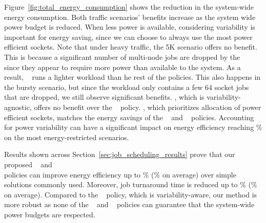 \par
Figure~\ref{fig:total_energy_consumption} shows the reduction in the system-wide energy
consumption. Both traffic scenarios' benefits increase as the system wide power budget is
reduced.  When less power is available, considering variability is important for energy
saving, since we can choose to always use the most power efficient sockets.  Note that
under heavy traffic, the 5K scenario offers no benefit.  This is because a significant
number of multi-node jobs are dropped by the \DefaultSched~ since they appear to require
more power than available to the system.  As a result, \DefaultSched~ runs a lighter
workload than he rest of the policies.  This also happens in the bursty scenario, but
since the workload only contains a few 64 socket jobs that are dropped, we still observe
significant benefits.  \PESched, which is variability-agnostic, offers no benefit over the
\DefaultSched~ policy.  \PEVASched, which prioritizes allocation of power efficient
sockets, matches the energy savings of the \PRVSSched~ and \PMCVSSched~ policies.
Accounting for power variability can have a significant impact on energy efficiency
reaching \MaxEnergy\% on the most energy-restricted scenarios.
\par
Results shown across Section~\ref{sec:job_scheduling_results} prove that our proposed
\PRVSSched~ and \PMCVSSched~\\
policies can improve energy efficiency up to \MaxEnergy\% (\AvgEnergy\% on
average) over simple solutions commonly used.  Moreover, job turnaround time is reduced up
to \MaxJTT\% (\AvgJTT\% on average).  Compared to the \PEVASched~ policy, which is
variability-aware, our method is more robust  as none of the  \PESched~ and \PEVASched~
policies can guarantee that the system-wide power budgets are respected. 

